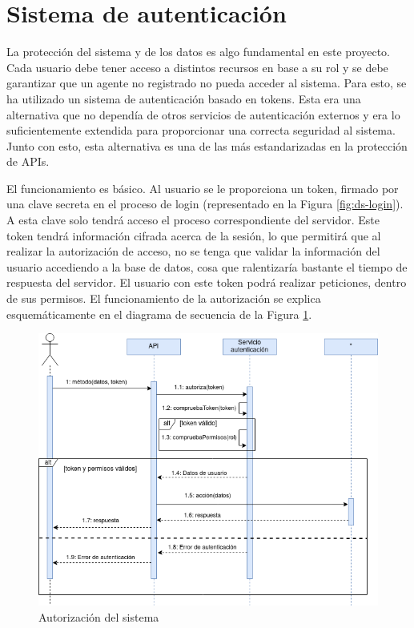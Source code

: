 \section{Sistema de autenticación}

La protección del sistema y de los datos es algo fundamental en este proyecto. Cada usuario debe tener acceso a distintos recursos en base a su rol y se debe garantizar que un agente no registrado no pueda acceder al sistema. Para esto, se ha utilizado un sistema de autenticación basado en tokens. Esta era una alternativa que no dependía de otros servicios de autenticación externos y era lo suficientemente extendida para proporcionar una correcta seguridad al sistema. Junto con esto, esta alternativa es una de las más estandarizadas en la protección de APIs.

El funcionamiento es básico. Al usuario se le proporciona un token, firmado por una clave secreta en el proceso de login (representado en la Figura \ref{fig:ds-login}). A esta clave solo tendrá acceso el proceso correspondiente del servidor. Este token tendrá información cifrada acerca de la sesión, lo que permitirá que al realizar la autorización de acceso, no se tenga que validar la información del usuario accediendo a la base de datos, cosa que ralentizaría bastante el tiempo de respuesta del servidor. El usuario con este token podrá realizar peticiones, dentro de sus permisos. El funcionamiento de la autorización se explica esquemáticamente en el diagrama de secuencia de la Figura \ref{fig:ds-auth}.

\begin{figure}[]
    \centering
    \includegraphics[width=\textwidth]{diseno/sistema/DS/autorizacion.png}
    \caption{Autorización del sistema}
    \label{fig:ds-auth}
\end{figure}

